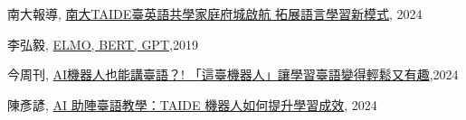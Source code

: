 \begin{thebibliography}{69}
南大報導, \hspace{0.5em} \href{https://epaper.nutn.edu.tw/newsreport-detail/4784}{南大TAIDE臺英語共學家庭府城啟航 拓展語言學習新模式}, \hspace{0.5em}2024

李弘毅, \hspace{0.5em} \href{https://www.youtube.com/watch?v=UYPa347-DdE}{ELMO, BERT, GPT},\hspace{0.5em}2019

今周刊, \hspace{0.5em} \href{https://www.youtube.com/watch?v=f4baNIOy8Fk}{AI機器人也能講臺語？! 「這臺機器人」讓學習臺語變得輕鬆又有趣},\hspace{0.5em}2024

 陳彥諺, \hspace{0.5em} \href{https://scitechvista.nat.gov.tw/Article/C000003/detail?ID=19d06a4b-6dfe-4a22-8cf1-197be0a4ac82}{AI 助陣臺語教學：TAIDE 機器人如何提升學習成效}, \hspace{0.5em}2024


\end{thebibliography}